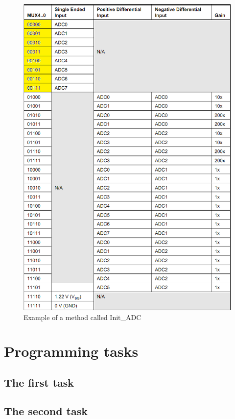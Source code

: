 \documentclass[english]{article}
\begin{document}
\begin{figure}[H]
\centerline{\includegraphics[scale=0.8]{MicroLab8/MUXn}}
\caption{Example of a method called Init\_ADC}
\end{figure}
\section{Programming tasks}

\subsection{The first task}



\subsection{The second task}


\end{document}
